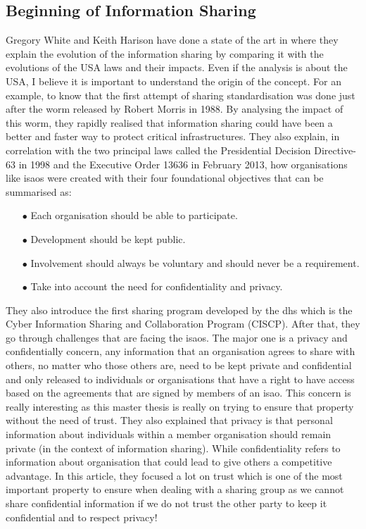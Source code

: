 \documentclass{eplmastersthesis}
\begin{document}
\subsection{Beginning of Information Sharing}
 Gregory White and Keith Harison have done a state of the art in \cite{white2017state} where they explain the evolution of the information sharing by comparing it with the evolutions of the USA laws and their impacts.
Even if the analysis is about the USA, I believe it is important to understand the origin of the concept. For an example, to know that the first attempt of sharing standardisation was done just after the worm released by Robert Morris in 1988.
By analysing the impact of this worm, they rapidly realised that information sharing could have been a better and faster way to protect critical infrastructures. They also explain, in correlation with the two principal laws called the Presidential Decision Directive-63 in 1998 and the Executive Order 13636 in February 2013, how organisations like \gls{isao}s were created with their four foundational objectives that can be summarised as:
\begin{itemize}
\item[$\bullet$] Each organisation should be able to participate.
\item[$\bullet$] Development should be kept public.
\item[$\bullet$] Involvement should always be voluntary and should never be a requirement.
\item[$\bullet$] Take into account the need for confidentiality and privacy.
\end{itemize}
They also introduce the first sharing program developed by the \gls{dhs} which is the Cyber Information Sharing and Collaboration Program (CISCP). After that, they go through challenges that are facing the \gls{isao}s. The major one is a privacy and confidentially concern, any information that an organisation agrees to share with others, no matter who those others are, need to be kept private and confidential and only released to individuals or organisations that have a right to have access based on the agreements that are signed by members of an \gls{isao}. This concern is really interesting as this master thesis is really on trying to ensure that property without the need of trust. They also explained that privacy is that personal information about individuals within a member organisation should remain private (in the context of information sharing).
While confidentiality refers to information about organisation that could lead to give others a competitive advantage.
In this article, they focused a lot on trust which is one of the most important property to ensure when dealing with a sharing group as we cannot share confidential information if we do not trust the other party to keep it confidential and to respect privacy! \\
\end{document}
